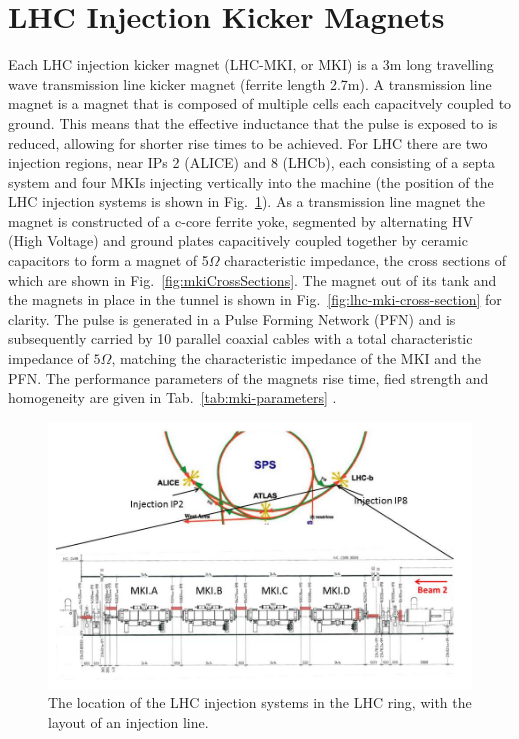 \section{LHC Injection Kicker Magnets}

Each LHC injection kicker magnet (LHC-MKI, or MKI) is a 3m long travelling wave transmission line kicker magnet (ferrite length 2.7m). A transmission line magnet is a magnet that is composed of multiple cells each capacitvely coupled to ground. This means that the effective inductance that the pulse is exposed to is reduced, allowing for shorter rise times to be achieved. For LHC there are two injection regions, near IPs 2 (ALICE) and 8 (LHCb), each consisting of a septa system and four MKIs injecting vertically into the machine (the position of the LHC injection systems is shown in Fig.~\ref{fig:lhc-injection-systems}). As a transmission line magnet the magnet is constructed of a c-core ferrite yoke, segmented by alternating HV (High Voltage) and ground plates capacitively coupled together by ceramic capacitors to form a magnet of 5$\Omega$ characteristic impedance, the cross sections of which are shown in Fig.~\ref{fig:mkiCrossSections}. The magnet out of its tank and the magnets in place in the tunnel is shown in Fig.~\ref{fig:lhc-mki-cross-section} for clarity. The pulse is generated in a Pulse Forming Network (PFN) and is subsequently carried by 10 parallel coaxial cables with a total characteristic impedance of $5 \Omega$, matching the characteristic impedance of the MKI and the PFN. The performance parameters of the magnets rise time, fied strength and homogeneity are given in Tab.~\ref{tab:mki-parameters} \cite{Ducimetiere:mkiSpec}.

\begin{figure}
\begin{center}
\includegraphics[width=1.0\textwidth]{LHC_MKI/figures/injectionPointsLayout.jpg}
\end{center}
\caption{The location of the LHC injection systems in the LHC ring, with the layout of an injection line.}
\label{fig:lhc-injection-systems}
\end{figure}

